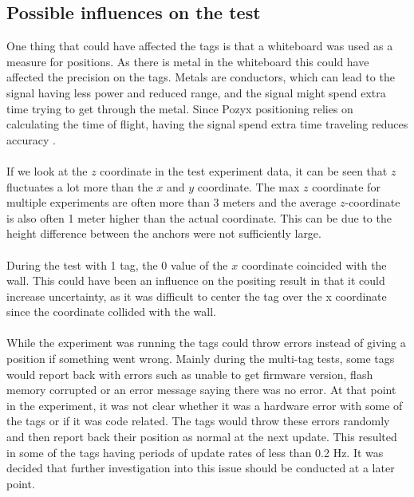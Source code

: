 \subsection{Possible influences on the test}
One thing that could have affected the tags is that a whiteboard was used as a measure for positions. 
As there is metal in the whiteboard this could have affected the precision on the tags.
Metals are conductors, which can lead to the signal having less power and reduced range, and the signal might spend extra time trying to get through the metal.
Since Pozyx positioning relies on calculating the time of flight, having the signal spend extra time traveling reduces accuracy \cite{pozyx-UWBObstacles}. 
\\\\
If we look at the $z$ coordinate in the test experiment data, it can be seen that $z$ fluctuates a lot more than the $x$ and $y$ coordinate. 
The max $z$ coordinate for multiple experiments are often more than 3 meters and the average $z$-coordinate is also often 1 meter higher than the actual coordinate.
This can be due to the height difference between the anchors were not sufficiently large.
\\\\
During the test with 1 tag, the 0 value of the $x$ coordinate coincided with the wall. 
This could have been an influence on the positing result in that it could increase uncertainty, as it was difficult to center the tag over the x coordinate since the coordinate collided with the wall.
\\\\
While the experiment was running the tags could throw errors instead of giving a position if something went wrong.
Mainly during the multi-tag tests, some tags would report back with errors such as unable to get firmware version, flash memory corrupted or an error message saying there was no error.
At that point in the experiment, it was not clear whether it was a hardware error with some of the tags or if it was code related.
The tags would throw these errors randomly and then report back their position as normal at the next update.
This resulted in some of the tags having periods of update rates of less than 0.2 Hz.
It was decided that further investigation into this issue should be conducted at a later point.

